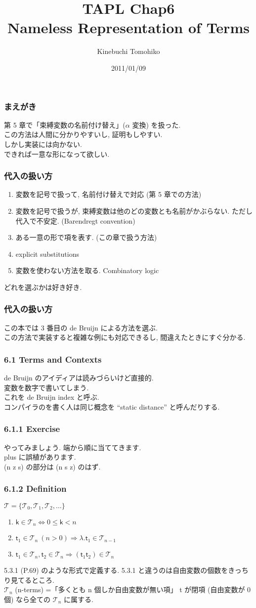 \documentclass[13pt,dvipdfm]{beamer}
\title{TAPL Chap6\\Nameless Representation of Terms}
\author{Kinebuchi Tomohiko}
\date{2011/01/09}
\begin{document}
\frame{\titlepage}

\frame
{
  \frametitle{まえがき}
  第 5 章で「束縛変数の名前付け替え」($\alpha$ 変換) を扱った.\\
  この方法は人間に分かりやすいし, 証明もしやすい.\\
  しかし実装には向かない.\\
  できれば一意な形になって欲しい.
}

\frame
{
  \frametitle{代入の扱い方}
  \begin{enumerate}
  \item 変数を記号で扱って, 名前付け替えで対応 (第 5 章での方法)
  \item 変数を記号で扱うが, 束縛変数は他のどの変数とも名前がかぶらない. ただし代入で不安定. (Barendregt convention)
  \item ある一意の形で項を表す. (この章で扱う方法)
  \item explicit substitutions
  \item 変数を使わない方法を取る. Combinatory logic
  \end{enumerate}
  どれを選ぶかは好き好き.
}

\frame
{
  \frametitle{代入の扱い方}
この本では 3 番目の de Bruijn による方法を選ぶ.\\
この方法で実装すると複雑な例にも対応できるし, 間違えたときにすぐ分かる.
}

\frame
{
  \frametitle{6.1 Terms and Contexts}
  de Bruijn のアイディアは読みづらいけど直接的.\\
  変数を数字で書いてしまう.\\
  これを de Bruijn index と呼ぶ.\\
  コンパイラのを書く人は同じ概念を ``static distance'' と呼んだりする.
}

\frame
{
  \frametitle{6.1.1 Exercise}
  やってみましょう. 端から順に当ててきます.\\
  plus に誤植があります.\\
  (n z s) の部分は (n s z) のはず.
}

\frame
{
  \frametitle{6.1.2 Definition}
  
  \begin{definition}
  $\mathcal{T} = \{\mathcal{T}_0, \mathcal{T}_1, \mathcal{T}_2,\dots\}$
  \begin{enumerate}
  \item $\mathsf{k} \in \mathcal{T}_n \Leftrightarrow 0 \leq \mathsf{k} < n$
  \item $\mathsf{t}_1 \in \mathcal{T}_n\ (n > 0) \Rightarrow \lambda.\mathsf{t}_1 \in \mathcal{T}_{n-1}$
  \item $\mathsf{t}_1 \in \mathcal{T}_n, \mathsf{t}_2 \in \mathcal{T}_n \Rightarrow (\mathsf{t}_1 \mathsf{t}_2) \in \mathcal{T}_n$
  \end{enumerate}
  \end{definition}

  5.3.1 (P.69) のような形式で定義する.
  5.3.1 と違うのは自由変数の個数をきっちり見てるところ.\\
  $\mathcal{T}_n$ (n-terms) =「多くとも n 個しか自由変数が無い項」
  t が閉項 (自由変数が 0 個) なら全ての $\mathcal{T}_n$ に属する.
}
\end{document}
